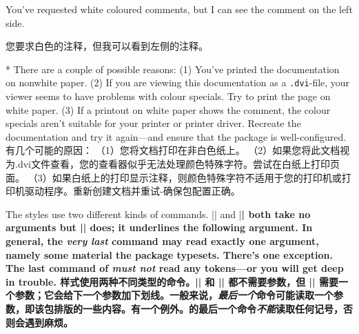 \begin{advise}
\begin{paracol}{2}
\item You've requested white coloured comments, but I can see the comment
      on the left side.
\switchcolumn
\item 您要求白色的注释，但我可以看到左侧的注释。

      \advisespace
\switchcolumn[0]*
      There are a couple of possible reasons:
      (1) You've printed the documentation on nonwhite paper.
      (2) If you are viewing this documentation as a \texttt{.dvi}-file, your
          viewer seems to have problems with colour specials. Try to print
          the page on white paper.
      (3) If a printout on white paper shows the comment, the colour
          specials aren't suitable for your printer or printer driver.
          Recreate the documentation and try it again---and ensure that
          the  package is well-configured.
\switchcolumn
有几个可能的原因：
（1）您将文档打印在非白色纸上。
（2）如果您将此文档视为.dvi文件查看，您的查看器似乎无法处理颜色特殊字符。尝试在白纸上打印页面。
（3）如果白纸上的打印显示注释，则颜色特殊字符不适用于您的打印机或打印机驱动程序。重新创建文档并重试-确保包配置正确。
\end{paracol}
\end{advise}

\begin{paracol}{2}
The styles use two different kinds of commands. |\ttfamily| and |\bfseries|
both take no arguments but |\underbar| does; it underlines the following
argument. In general, the \emph{very last} command may read exactly one
argument, namely some material the package typesets. There's one exception.
The last command of  \emph{must not} read any
tokens---or you will get deep in trouble.
\switchcolumn
样式使用两种不同类型的命令。|\ttfamily| 和 |\bfseries| 都不需要参数，但 |\underbar| 需要一个参数；它会给下一个参数加下划线。一般来说，\emph{最后一个}命令可能读取一个参数，即该包排版的一些内容。有一个例外。的最后一个命令\emph{不能}读取任何记号，否则会遇到麻烦。
\end{paracol}

